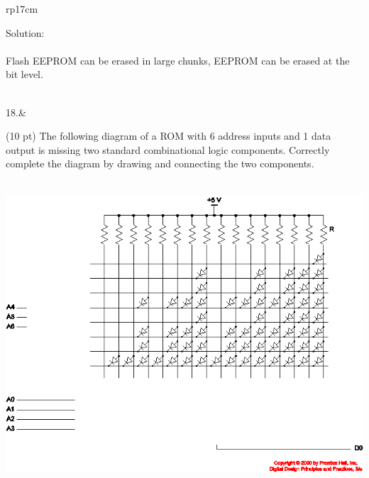\documentclass{article}
\begin{document}
\begin{longtable}[l]{rp{17cm}}
\begin{minipage}[t]{\linewidth}
Solution: \\ \\
Flash EEPROM can be erased in large chunks, EEPROM can be erased at the bit level.\\
\end{minipage}\\
\medskip
18.&\begin{minipage}[t]{\linewidth}(10 pt) The following diagram of a ROM with 6 address inputs and 1 data output is missing two standard combinational logic components.  Correctly complete the diagram by drawing and connecting the two components.\\ \\
\begin{center}
  \includegraphics[scale=0.4]{../Memory/Assessments/ROMStructureMissingParts}
\end{center}


\end{minipage}
\end{longtable}
\end{document}
